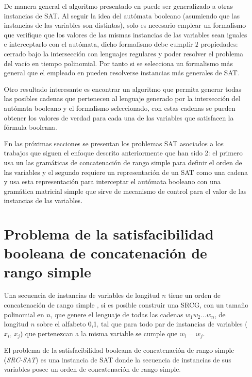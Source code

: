 \documentclass[12pt]{article}
\begin{document}
De manera general el algoritmo presentado en \cite{aCFSAT} puede ser generalizado a otras instancias de SAT. Al seguir
la idea del autómata booleano (asumiendo que las instancias de las variables son distintas), solo es necesario emplear un
formalismo que verifique que los valores de las mismas instancias de las variables sean iguales e interceptarlo con el autómata, 
dicho formalismo debe cumplir 2 propiedades: cerrado bajo la intersección con lenguajes regulares y poder resolver el problema 
del vacío en tiempo polinomial. Por tanto si se selecciona un formalismo más general que el empleado en \cite{aCFSAT}
pueden resolverse instancias más generales de SAT. 

Otro resultado interesante es encontrar un algoritmo que permita generar todas las posibles cadenas que pertenecen al lenguaje
generado por la intersección del autómata booleano y el formalismo seleccionado, con estas cadenas se pueden obtener los valores de
verdad para cada una de las variables que satisfacen la fórmula booleana.

En las próximas secciones se presentan los problemas SAT asociados a los trabajos que siguen el enfoque descrito anteriormente
que han sido 2: el primero usa un las gramáticas de concatenación de rango simple para definir el orden de las
variables y el segundo requiere un representación de un SAT como una cadena y usa esta representación para interceptar
el autómata booleano con una gramática matricial simple que sirve de mecanismo de control para el valor de las instancias
de las variables.

\section{Problema de la satisfacibilidad booleana de concatenación de rango simple}

Una secuencia de instancias de variables de longitud $n$ tiene un orden de concatenación de rango simple \cite{aSRCSAT}, 
si es posible construir una SRCG, con un tamaño polinomial en $n$, que genere el lenguaje de todas las cadenas 
$w_1w_2 \ldots w_n$, de longitud $n$ sobre el alfabeto {0,1}, tal que para todo par de instancias de variables 
($x_i$, $x_j$) que pertenezcan a la misma variable se cumple que $w_i = w_j$.

El problema de la satisfacibilidad booleana de concatenación de rango simple (\textit{SRC-SAT}) es una instancia de
SAT donde la secuencia de instancias de sus variables posee un orden de concatenación de rango simple.
\end{document}

